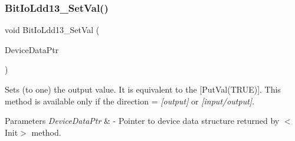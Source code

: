 \subsubsection{\texorpdfstring{Bit\+Io\+Ldd13\+\_\+\+Set\+Val()}{BitIoLdd13\_SetVal()}}
{\footnotesize\ttfamily void Bit\+Io\+Ldd13\+\_\+\+Set\+Val (\begin{DoxyParamCaption}\item[{\hyperlink{group___p_e___types__module_gac5cf1362f1f0e3a2ce71b1bf2276d091}{L\+D\+D\+\_\+\+T\+Device\+Data} $\ast$}]{Device\+Data\+Ptr }\end{DoxyParamCaption})}



Sets (to one) the output value. It is equivalent to the \mbox{[}Put\+Val(\+T\+R\+U\+E)\mbox{]}. This method is available only if the direction = {\itshape \mbox{[}output\mbox{]}} or {\itshape \mbox{[}input/output\mbox{]}}. 


\begin{DoxyParams}{Parameters}
{\em Device\+Data\+Ptr} & -\/ Pointer to device data structure returned by $<$\+Init$>$ method. \\
\hline
\end{DoxyParams}
